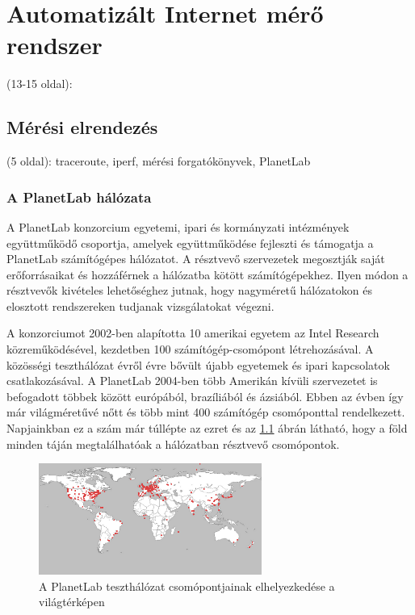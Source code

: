 \chapter{Automatizált Internet mérő rendszer}
(13-15 oldal): 


\section{Mérési elrendezés}
(5 oldal): traceroute, iperf, mérési forgatókönyvek, PlanetLab

\subsection{A PlanetLab hálózata}

A PlanetLab konzorcium egyetemi, ipari és kormányzati intézmények együttműködő csoportja, amelyek együttműködése fejleszti és támogatja a PlanetLab számítógépes hálózatot. A résztvevő szervezetek megosztják saját erőforrásaikat és hozzáférnek a hálózatba kötött számítógépekhez. Ilyen módon a résztvevők kivételes lehetőséghez jutnak, hogy  nagyméretű hálózatokon és elosztott rendszereken tudjanak vizsgálatokat végezni.

A konzorciumot 2002-ben alapította 10 amerikai egyetem az Intel Research közreműködésével, kezdetben 100 számítógép-csomópont létrehozásával. A közösségi teszthálózat évről évre bővült újabb egyetemek és ipari kapcsolatok csatlakozásával. A PlanetLab 2004-ben több Amerikán kívüli szervezetet is befogadott többek között európából, brazíliából és ázsiából. Ebben az évben így már világméretűvé nőtt és több mint 400 számítógép csomóponttal rendelkezett. Napjainkban ez a szám már túllépte az ezret és az \ref{fig:planetlab} ábrán látható, hogy a föld minden táján megtalálhatóak a hálózatban résztvevő csomópontok.

\begin{figure}[!ht]
	\centering
	\includegraphics[width=0.65\textwidth, keepaspectratio]{figures/planetlab_worldmap.png}
	\caption{A PlanetLab teszthálózat csomópontjainak elhelyezkedése a világtérképen\label{fig:planetlab}}
\end{figure}

